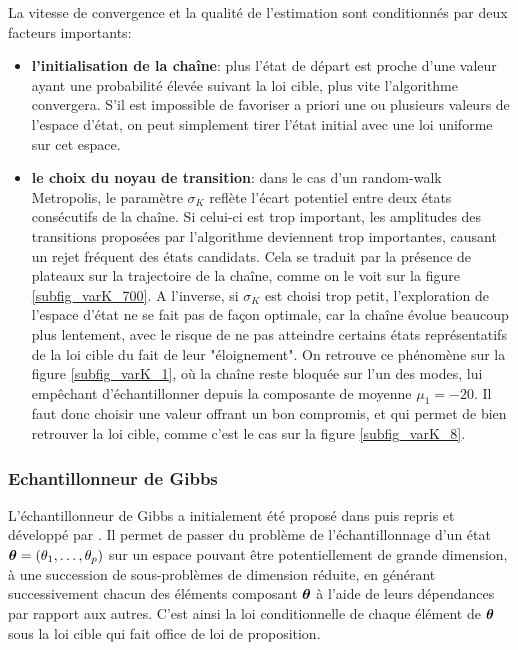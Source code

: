 \newpage 


La vitesse de convergence et la qualité de l'estimation sont conditionnés par deux facteurs importants: 
\begin{itemize}
	\item \textbf{l'initialisation de la chaîne}: plus l'état de départ est proche d'une valeur ayant une probabilité élevée suivant la loi cible, plus vite l'algorithme convergera. S'il est impossible de favoriser a priori une ou plusieurs valeurs de l'espace d'état, on peut simplement tirer l'état initial avec une loi uniforme sur cet espace.
	\item \textbf{le choix du noyau de transition}: dans le cas d'un random-walk Metropolis, le paramètre $\sigma_K$ reflète l'écart potentiel entre deux états consécutifs de la chaîne. Si celui-ci est trop important, les amplitudes des transitions proposées par l'algorithme deviennent trop importantes, causant un rejet fréquent des états candidats. Cela se traduit par la présence de plateaux sur la trajectoire de la chaîne, comme on le voit sur la figure \ref{subfig_varK_700}. A l'inverse, si $\sigma_K$ est choisi trop petit, l'exploration de l'espace d'état ne se fait pas de façon optimale, car la chaîne évolue beaucoup plus lentement, avec le risque de ne pas atteindre certains états représentatifs de la loi cible du fait de leur "éloignement". On retrouve ce phénomène sur la figure \ref{subfig_varK_1}, où la chaîne reste bloquée sur l'un des modes, lui empêchant d'échantillonner depuis la composante de moyenne $\mu_1 = -20$. Il faut donc choisir une valeur offrant un bon compromis, et qui permet de bien retrouver la loi cible, comme c'est le cas sur la figure \ref{subfig_varK_8}. 
\end{itemize}

\subsubsection{Echantillonneur de Gibbs}
L'échantillonneur de Gibbs a initialement été proposé dans \cite{Geman1984} puis repris et développé par \cite{Gelfand1990}. Il permet de passer du problème de l'échantillonnage d'un état ${\bm{\theta}} = (\theta_1, \dots, \theta_p)$ sur un espace pouvant être potentiellement de grande dimension, à une succession de sous-problèmes {de dimension réduite}, en générant successivement chacun des éléments composant ${\bm{\theta}}$ à l'aide de leurs dépendances par rapport aux autres. C'est ainsi la loi conditionnelle de chaque élément de ${\bm{\theta}}$ sous la loi cible qui fait office de loi de proposition.

